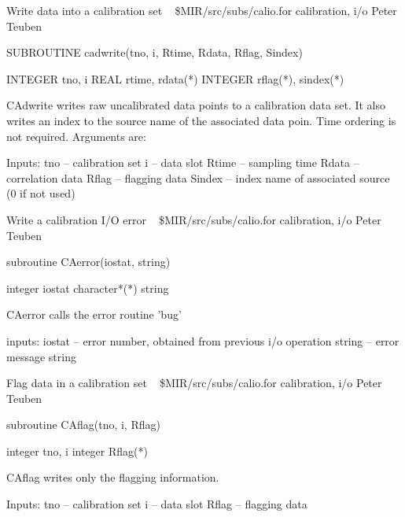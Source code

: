 %
\noindent Write data into a calibration set
\newline \ 
\newline {} \$MIR/src/subs/calio.for
\newline {} calibration, i/o
\newline {} Peter Teuben
\par{\tenpoint
{\eightpoint\begintt
        SUBROUTINE cadwrite(tno, i, Rtime, Rdata, Rflag, Sindex)

        INTEGER tno, i
        REAL    rtime, rdata(*)
        INTEGER rflag(*), sindex(*)

    CAdwrite writes raw uncalibrated data points to a calibration data
    set.  It also writes an index to the source name of the associated
    data poin. Time ordering is not required.  Arguments are:

  Inputs:
       tno     -- calibration set
       i       -- data slot
       Rtime   -- sampling time
       Rdata   -- correlation data
       Rflag   -- flagging data
       Sindex  -- index name of associated source (0 if not used)
\endtt}
\par}
%
\noindent Write a calibration I/O error
\newline \ 
\newline {} \$MIR/src/subs/calio.for
\newline {} calibration, i/o
\newline \abox{Responsible:} Peter Teuben
\par{\tenpoint
{\eightpoint\begintt
        subroutine CAerror(iostat, string)

        integer iostat
        character*(*) string

   CAerror calls the error routine 'bug'

   inputs:
       iostat      -- error number, obtained from previous i/o operation
       string      -- error message string
\endtt}
\par}
%
\noindent Flag data in a calibration set
\newline \ 
\newline {} \$MIR/src/subs/calio.for
\newline \abox{Keywords:} calibration, i/o
\newline {} Peter Teuben
\par{\tenpoint
{\eightpoint\begintt
        subroutine CAflag(tno, i, Rflag)

        integer tno, i
        integer Rflag(*)

    CAflag writes only the flagging information.

  Inputs:
       tno     -- calibration set
       i       -- data slot
       Rflag   -- flagging data
\endtt}
\par}
